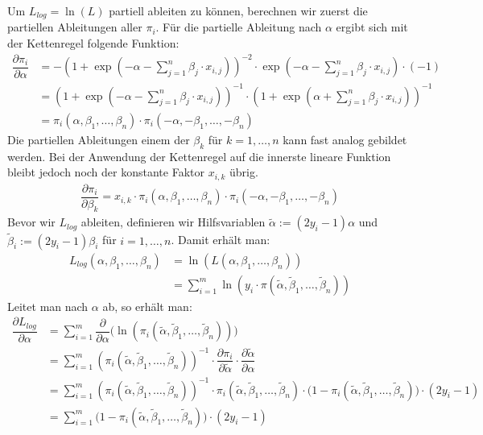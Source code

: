 Um $L_{log} = \ln(L)$ partiell ableiten zu können, berechnen wir zuerst die partiellen Ableitungen aller $\pi_i$. Für die partielle Ableitung nach $\alpha$ ergibt sich mit der Kettenregel folgende Funktion:
\begin{align*}
    \dfrac{\partial \pi_i}{\partial \alpha} &= - \left( 1 + \exp \left(- \alpha - \sum_{j=1}^n \beta_j \cdot x_{i, j} \right) \right)^{-2} \cdot \exp \left(- \alpha - \sum_{j=1}^n \beta_j \cdot x_{i, j} \right) \cdot (-1) \\
    &= \left( 1 + \exp \left(- \alpha - \sum_{j=1}^n \beta_j \cdot x_{i, j} \right) \right)^{-1} \cdot \left( 1 + \exp \left(\alpha + \sum_{j=1}^n \beta_j \cdot x_{i, j} \right) \right)^{-1} \\
    &= \pi_i(\alpha, \beta_1, \dots, \beta_n) \cdot \pi_i(- \alpha, - \beta_1, \dots, - \beta_n)
\end{align*}
Die partiellen Ableitungen einem der $\beta_k$ für $k = 1, \dots, n$ kann fast analog gebildet werden. Bei der Anwendung der Kettenregel auf die innerste lineare Funktion bleibt jedoch noch der konstante Faktor $x_{i, k}$ übrig.
\begin{align*}
    \dfrac{\partial \pi_i}{\partial \beta_k} = x_{i, k} \cdot \pi_i(\alpha, \beta_1, \dots, \beta_n) \cdot \pi_i(- \alpha, - \beta_1, \dots, - \beta_n)
\end{align*}
Bevor wir $L_{log}$ ableiten, definieren wir Hilfsvariablen $\tilde\alpha := (2 y_i - 1) \alpha$ und $\tilde\beta_i := (2 y_i - 1) \beta_i$ für $i = 1, \dots, n$. Damit erhält man:
\begin{align*}
    L_{log}(\alpha, \beta_1, \dots, \beta_n) &= \ln(L(\alpha, \beta_1, \dots, \beta_n)) \\
    &= \sum_{i=1}^m \ln \left(y_i \cdot \pi(\tilde\alpha, \tilde\beta_1, \dots, \tilde\beta_n) \right)
\end{align*}
Leitet man nach $\alpha$ ab, so erhält man:
\begin{align*}
    \dfrac{\partial L_{log}}{\partial \alpha} &= \sum_{i=1}^m \dfrac{\partial}{\partial \alpha} \bigg( \ln \left( \pi_i(\tilde\alpha, \tilde\beta_1, \dots, \tilde\beta_n) \right) \bigg) \\
    &= \sum_{i=1}^m \left( \pi_i(\tilde\alpha, \tilde\beta_1, \dots, \tilde\beta_n) \right)^{-1} \cdot \dfrac{\partial \pi_i}{\partial \tilde\alpha} \cdot \dfrac{\partial \tilde\alpha}{\partial \alpha} \\
    &= \sum_{i=1}^m \left( \pi_i(\tilde\alpha, \tilde\beta_1, \dots, \tilde\beta_n) \right)^{-1} \cdot \pi_i(\tilde\alpha, \tilde\beta_1, \dots, \tilde\beta_n) \cdot \big(1 - \pi_i(\tilde\alpha, \tilde\beta_1, \dots, \tilde\beta_n) \big) \cdot (2 y_i - 1) \\
    &= \sum_{i=1}^m \big(1 - \pi_i(\tilde\alpha, \tilde\beta_1, \dots, \tilde\beta_n) \big) \cdot (2 y_i - 1)
\end{align*}
